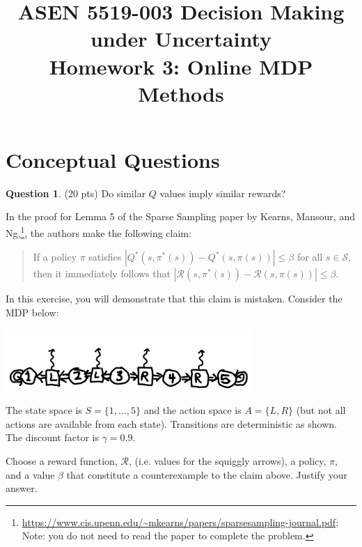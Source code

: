 \documentclass{article}
\title{ASEN 5519-003 Decision Making under Uncertainty\\
       Homework 3: Online MDP Methods}
\theoremstyle{definition}
\newtheorem{question}[thm]{Question}
\begin{document}
\maketitle

\section{Conceptual Questions}

\begin{question} (20 pts) Do similar $Q$ values imply similar rewards?

    In the proof for Lemma 5 of the Sparse Sampling paper by Kearns, Mansour, and Ng,\footnote{\url{https://www.cis.upenn.edu/~mkearns/papers/sparsesampling-journal.pdf}; Note: you do not need to read the paper to complete the problem.}, the authors make the following claim:
    \begin{quote}
    If a policy $\pi$ satisfies $|Q^*(s, \pi^*(s)) - Q^*(s, \pi(s))| \leq \beta$ for all $s \in \mathcal{S}$, then it immediately follows that $|\mathcal{R}(s, \pi^*(s)) - \mathcal{R}(s, \pi(s))| \leq \beta$.
    \end{quote}
    In this exercise, you will demonstrate that this claim is mistaken. Consider the MDP below:
    \begin{center}
        \includegraphics[width=0.7\textwidth]{hand_mdp.pdf}
    \end{center}
    The state space is $S = \{1, \ldots, 5\}$ and the action space is $A = \{L, R\}$ (but not all actions are available from each state). Transitions are deterministic as shown. The discount factor is $\gamma=0.9$.

    Choose a reward function, $\mathcal{R}$, (i.e. values for the squiggly arrows), a policy, $\pi$, and a value $\beta$ that constitute a counterexample to the claim above. Justify your answer.
\end{question}
\end{document}
